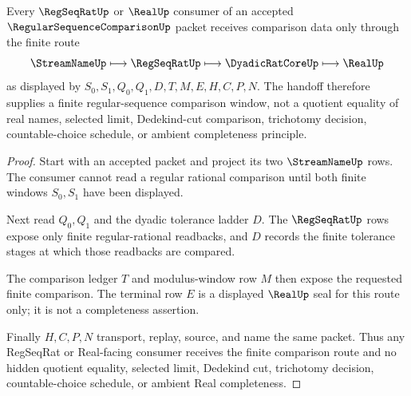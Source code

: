 \begin{theorem}
\label{thm:regular-sequence-comparison-regseqrat-handoff}
Every $\RegSeqRatUp$ or $\RealUp$ consumer of an accepted $\RegularSequenceComparisonUp$ packet receives comparison data only through the finite route
$$
\StreamNameUp \longmapsto \RegSeqRatUp \longmapsto \DyadicRatCoreUp \longmapsto \RealUp
$$
as displayed by $S_0,S_1,Q_0,Q_1,D,T,M,E,H,C,P,N$. The handoff therefore supplies a finite regular-sequence comparison window, not a quotient equality of real names, selected limit, Dedekind-cut comparison, trichotomy decision, countable-choice schedule, or ambient completeness principle.
\end{theorem}
\begin{proof}
Start with an accepted packet and project its two $\StreamNameUp$ rows. The consumer cannot read a regular rational comparison until both finite windows $S_0,S_1$ have been displayed.

Next read $Q_0,Q_1$ and the dyadic tolerance ladder $D$. The $\RegSeqRatUp$ rows expose only finite regular-rational readbacks, and $D$ records the finite tolerance stages at which those readbacks are compared.

The comparison ledger $T$ and modulus-window row $M$ then expose the requested finite comparison. The terminal row $E$ is a displayed $\RealUp$ seal for this route only; it is not a completeness assertion.

Finally $H,C,P,N$ transport, replay, source, and name the same packet. Thus any RegSeqRat or Real-facing consumer receives the finite comparison route and no hidden quotient equality, selected limit, Dedekind cut, trichotomy decision, countable-choice schedule, or ambient Real completeness.
\end{proof}


\begin{closurestatus}{\RegularSequenceComparisonUp}
  \theoryclosure{\seedClosure}
  \formalstatus{\unformalizedV}
\end{closurestatus}
